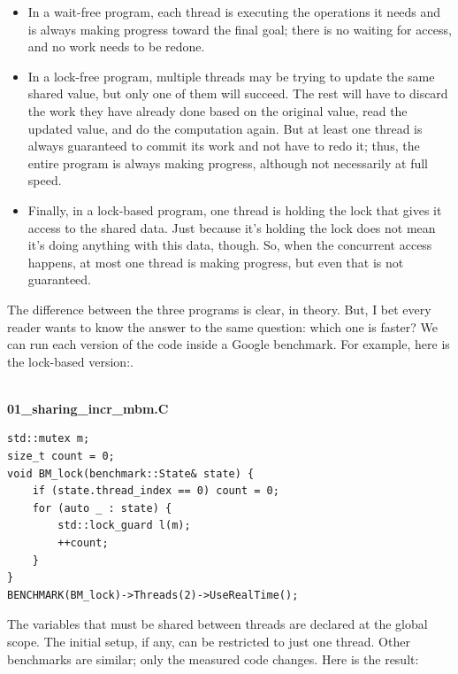 \begin{itemize}
\item In a wait-free program, each thread is executing the operations it needs and is always making progress toward the final goal; there is no waiting for access, and no work needs to be redone.

\item In a lock-free program, multiple threads may be trying to update the same shared value, but only one of them will succeed. The rest will have to discard the work they have already done based on the original value, read the updated value, and do the computation again. But at least one thread is always guaranteed to commit its work and not have to redo it; thus, the entire program is always making progress, although not necessarily at full speed.

\item Finally, in a lock-based program, one thread is holding the lock that gives it access to the shared data. Just because it's holding the lock does not mean it's doing anything with this data, though. So, when the concurrent access happens, at most one thread is making progress, but even that is not guaranteed.
\end{itemize}

The difference between the three programs is clear, in theory. But, I bet every reader wants to know the answer to the same question: which one is faster? We can run each version of the code inside a Google benchmark. For example, here is the lock-based version:.

\hspace*{\fill} \\ %
\noindent
\textbf{01\_sharing\_incr\_mbm.C}
\begin{lstlisting}[style=styleCXX]
std::mutex m;
size_t count = 0;
void BM_lock(benchmark::State& state) {
	if (state.thread_index == 0) count = 0;
	for (auto _ : state) {
		std::lock_guard l(m);
		++count;
	}
}
BENCHMARK(BM_lock)->Threads(2)->UseRealTime();
\end{lstlisting}

The variables that must be shared between threads are declared at the global scope. The initial setup, if any, can be restricted to just one thread. Other benchmarks are similar; only the measured code changes. Here is the result:

